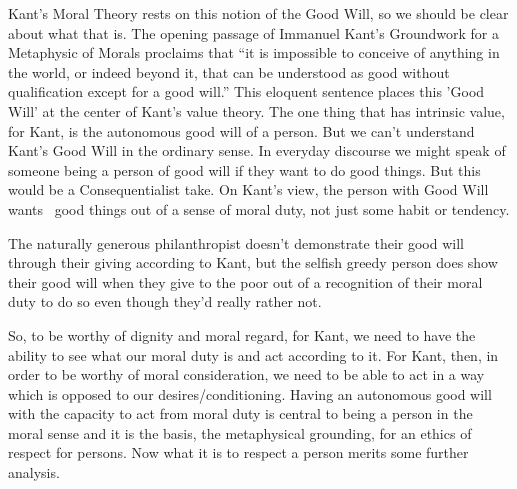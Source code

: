Kant's Moral Theory rests on this notion of the Good Will, so we should be clear about what that is. The opening passage of Immanuel Kant’s Groundwork for a Metaphysic of Morals proclaims that “it is impossible to conceive of anything in the world, or indeed beyond it, that can be understood as good without qualification except for a good will.” This eloquent sentence places this 'Good Will' at the center of Kant's value theory. The one thing that has intrinsic value, for Kant, is the autonomous good will of a person. But we can't understand Kant's Good Will in the ordinary sense. In everyday discourse we might speak of someone being a person of good will if they want to do good things. But this would be a Consequentialist take. On Kant’s view, the person with Good Will wants  good things out of a sense of moral duty, not just some habit or tendency.

The naturally generous philanthropist doesn’t demonstrate their good will through their giving according to Kant, but the selfish greedy person does show their good will when they give to the poor out of a recognition of their moral duty to do so even though they’d really rather not.

So, to be worthy of dignity and moral regard, for Kant, we need to have the ability to see what our moral duty is and act according to it. For Kant, then, in order to be worthy of moral consideration, we need to be able to act in a way which is opposed to our desires/conditioning. Having an autonomous good will with the capacity to act from moral duty is central to being a person in the moral sense and it is the basis, the metaphysical grounding, for an ethics of respect for persons. Now what it is to respect a person merits some further analysis.

